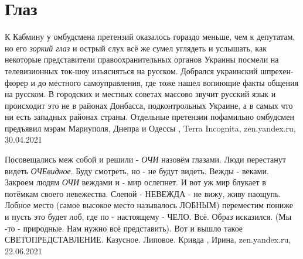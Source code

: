  
 
 
 
 
\chapter{Глаз}
\label{sec:slova.glaz}

К Кабмину у омбудсмена претензий оказалось гораздо меньше, чем к депутатам, но
его \emph{зоркий глаз} и острый слух всё же сумел углядеть и услышать, как некоторые
представители правоохранительных органов Украины посмели на телевизионных
ток-шоу изъясняться на русском.  Добрался украинский шпрехен-фюрер и до
местного самоуправления, где тоже нашел вопиющие факты общения на русском. В
городских и местных советах массово звучит русский язык и происходит это не в
районах Донбасса, подконтрольных Украине, а в самых что ни есть западных
районах страны. Отдельные претензии пофамильно омбудсмен предъявил мэрам
Мариуполя, Днепра и Одессы
, 
Terra Incognita, zen.yandex.ru, 30.04.2021

Посовещались меж собой и решили - \emph{ОЧИ} назовём глазами. Люди перестанут видеть
\emph{ОЧЕвидное}. Буду смотреть, но - не будут видеть. Вежды - веками. Закроем людям
\emph{ОЧИ} веждами и - мир ослепнет. И вот уж мир блукает в потёмкам своего
невежества. Слепой - НЕВЕЖДА - не вижу, живу наощупь.  Лобное место (самое
высокое место называлось ЛОБНЫМ) переместим пониже и пусть это будет лоб, где
по - настоящему - ЧЕЛО. Всё. Образ исказился.  (Мы -то - природные. Нам нужно
всё представить). Вот и вышло такое СВЕТОПРЕДСТАВЛЕНИЕ. Казусное. Липовое.
Кривда 
, 
Ирина, zen.yandex.ru, 22.06.2021


